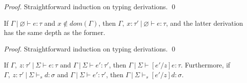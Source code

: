 \documentclass{llncs}
\begin{document}
\begin{proof}
Straightforward induction on typing derivations. \qed
\end{proof}

\vspace{8pt}

\begin{lemma}[Weakening]
If $\Gamma~|~\varnothing \vdash e : \tau$ and $x \not\in dom(\Gamma)$, then $\Gamma,~x : \tau'~|~\varnothing \vdash e : \tau$, and the latter derivation has the same depth as the former.
\end{lemma}

\begin{proof}
Straightforward induction on typing derivations. \qed
\end{proof}

\vspace{8pt}

\begin{lemma}
If $\Gamma,~z : \tau'~|~\Sigma \vdash e : \tau$ and $\Gamma~|~\Sigma \vdash e' : \tau'$, then $\Gamma~|~\Sigma \vdash [e'/z]e : \tau$. Furthermore, if $\Gamma,~z : \tau'~|~\Sigma \vdash_s d : \sigma$ and $\Gamma~|~\Sigma \vdash e' : \tau'$, then $\Gamma~|~\Sigma \vdash_s [e'/z]d : \sigma$.
\end{lemma}
\end{document}
